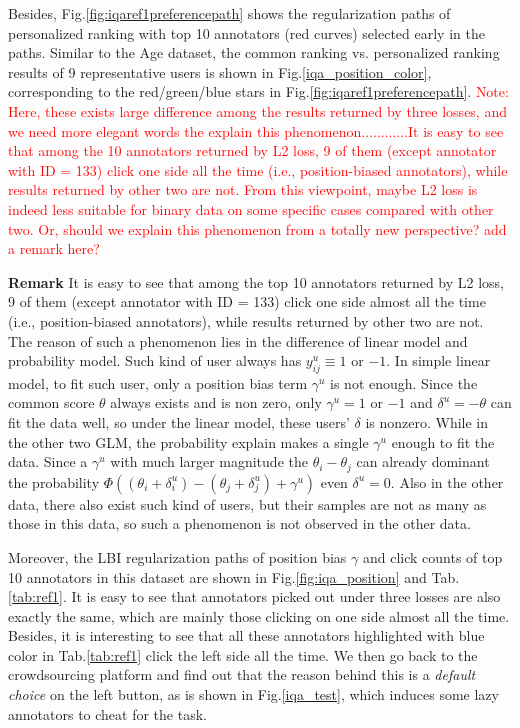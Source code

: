 \documentclass[10pt,journal,cspaper,compsoc]{IEEEtran}
\begin{document}
{Besides, Fig.\ref{fig:iqaref1preferencepath} shows the regularization paths of personalized ranking with top 10 annotators (red curves) selected early in the paths.
Similar to the Age dataset, the common ranking vs. personalized ranking results of 9 representative users is shown in Fig.\ref{iqa_position_color}, corresponding to the red/green/blue stars in Fig.\ref{fig:iqaref1preferencepath}. \textcolor{red}{Note: Here, these exists large difference among the results returned by three losses, and we need more elegant words the explain this phenomenon............It is easy to see
that among the 10 annotators returned by L2 loss, 9 of them (except annotator
with ID = 133) click one side all the time (i.e., position-biased
annotators), while results returned by other two are not. From this viewpoint, maybe L2 loss is indeed less suitable for binary data on some specific cases compared with other two. Or, should we explain this phenomenon from a totally new perspective? add a remark here? }

\textcolor[rgb]{1.00,0.00,0.00}{\textbf{Remark} It is easy to see
that among the top 10 annotators returned by L2 loss, 9 of them (except annotator
with ID = 133) click one side almost all the time (i.e., position-biased
annotators), while results returned by other two are not. The reason of such a phenomenon lies in the difference of linear model and probability model. Such kind of user always has $y^u_{ij}\equiv 1$ or $-1$. In simple linear model, to fit such user, only a position bias term $\gamma^u$ is not enough. Since the common score $\theta$ always exists and is non zero, only $\gamma^u = 1$ or $-1$ and $\delta^u = -\theta$ can fit the data well, so under the linear model, these users' $\delta$ is nonzero. While in the other two GLM, the probability explain makes a single $\gamma^u$ enough to fit the data. Since a $\gamma^u$ with much larger magnitude the $\theta_i-\theta_j$ can already dominant the probability $\Phi((\theta_i+\delta_i^u) - (\theta_j+\delta_j^u) + \gamma^u)$ even $\delta^u = 0$. Also in the other data, there also exist such kind of users, but their samples are not as many as those in this data, so such a phenomenon is not observed in the other data.}

Moreover, the LBI regularization paths of position bias $\gamma$ and click counts of top 10 annotators in this dataset are shown in Fig.\ref{fig:iqa_position} and Tab.\ref{tab:ref1}. It is easy to see that annotators picked out under three losses are also exactly the same, which are mainly those clicking on
one side almost all the time. Besides, it is interesting to see
that all these annotators highlighted with blue color in
Tab.\ref{tab:ref1} click the left side all the time. We then go back to
the crowdsourcing platform and find out that the reason behind
this is a \emph{default choice} on the left button, as is shown in Fig.\ref{iqa_test}, which induces
some lazy annotators to cheat for the task.



}
\end{document}

